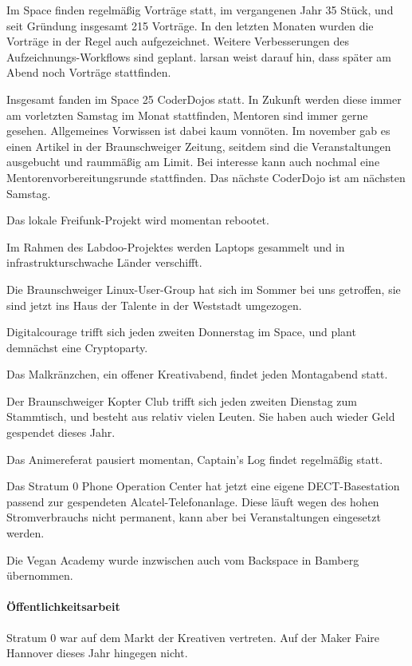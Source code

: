 \documentclass{s0minutes}
\begin{document}
Im Space finden regelmäßig Vorträge statt, im vergangenen Jahr 35 Stück, und seit Gründung insgesamt 215 Vorträge. In den letzten Monaten wurden die Vorträge in der Regel auch aufgezeichnet. Weitere Verbesserungen des Aufzeichnungs-Workflows sind geplant. larsan weist darauf hin, dass später am Abend noch Vorträge stattfinden.

Insgesamt fanden im Space 25 CoderDojos statt. In Zukunft werden diese immer am vorletzten Samstag im Monat stattfinden, Mentoren sind immer gerne gesehen. Allgemeines Vorwissen ist dabei kaum vonnöten. Im november gab es einen Artikel in der Braunschweiger Zeitung, seitdem sind die Veranstaltungen ausgebucht und raummäßig am Limit. Bei interesse kann auch nochmal eine Mentorenvorbereitungsrunde stattfinden. Das nächste CoderDojo ist am nächsten Samstag.

Das lokale Freifunk-Projekt wird momentan rebootet.

Im Rahmen des Labdoo-Projektes werden Laptops gesammelt und in infrastrukturschwache Länder verschifft.

Die Braunschweiger Linux-User-Group hat sich im Sommer bei uns getroffen, sie sind jetzt ins Haus der Talente in der Weststadt umgezogen.

Digitalcourage trifft sich jeden zweiten Donnerstag im Space, und plant demnächst eine Cryptoparty.

Das Malkränzchen, ein offener Kreativabend, findet jeden Montagabend statt.

Der Braunschweiger Kopter Club trifft sich jeden zweiten Dienstag zum Stammtisch, und besteht aus relativ vielen Leuten. Sie haben auch wieder Geld gespendet dieses Jahr.

Das Animereferat pausiert momentan, Captain's Log findet regelmäßig statt.

Das Stratum 0 Phone Operation Center hat jetzt eine eigene DECT-Basestation passend zur gespendeten Alcatel-Telefonanlage. Diese läuft wegen des hohen Stromverbrauchs nicht permanent, kann aber bei Veranstaltungen eingesetzt werden.

Die Vegan Academy wurde inzwischen auch vom Backspace in Bamberg übernommen.

\paragraph{Öffentlichkeitsarbeit}

Stratum 0 war auf dem Markt der Kreativen vertreten. Auf der Maker Faire Hannover dieses Jahr hingegen nicht.
\end{document}
